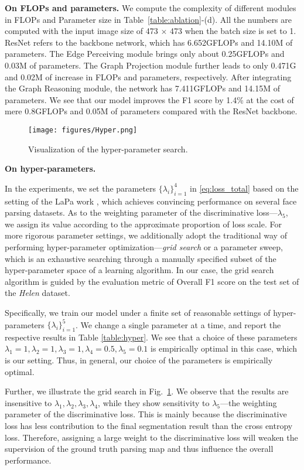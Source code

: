 \textbf{On FLOPs and parameters.} 
We compute the complexity of different modules in FLOPs and Parameter size in Table~\ref{table:ablation}-(d). 
All the numbers are computed with the input image size of 473 $\times$ 473 when the batch size is set to 1.
ResNet refers to the backbone network, which has 6.652GFLOPs and 14.10M of parameters. The Edge Perceiving module brings only about 0.25GFLOPs and 0.03M of parameters. 
The Graph Projection module further leads to only 0.471G and 0.02M of increase in FLOPs and parameters, respectively. After integrating the Graph Reasoning module, the network has 7.411GFLOPs and 14.15M of parameters. 
We see that our model improves the F1 score by 1.4\% at the cost of mere 0.8GFLOPs and 0.05M of parameters compared with the ResNet backbone.  

\begin{figure}[htbp]
    \centering
    \texttt{[image: figures/Hyper.png]}
    \caption{Visualization of the hyper-parameter search.}
    \label{fig:hyper}
\end{figure}


\textbf{On hyper-parameters.}

In the experiments, we set the parameters $\{\lambda_i\}_{i=1}^4$ in \eqref{eq:loss_total} based on the setting of the LaPa work \cite{liu2020new}, which achieves convincing performance on several face parsing datasets. As to the weighting parameter of the discriminative loss---$\lambda_5$, we assign its value according to the approximate proportion of loss scale.
For more rigorous parameter settings, we additionally adopt the traditional way of performing hyper-parameter optimization---{\it grid search} or a parameter sweep, which is an exhaustive searching through a manually specified subset of the hyper-parameter space of a learning algorithm. 
In our case, the grid search algorithm is guided by the evaluation metric of Overall F1 score on the test set of the {\it Helen} dataset. 

Specifically, we train our model under a finite set of reasonable settings of hyper-parameters $\{\lambda_i\}_{i=1}^5$. We change a single parameter at a time, and report the respective results in Table \ref{table:hyper}. 
We see that a choice of these parameters $\lambda_1 =1,\lambda_2 =1,\lambda_3 =1,\lambda_4 =0.5,\lambda_5=0.1$ is empirically optimal in this case, which is our setting. Thus, in general, our choice of the parameters is empirically optimal.

Further, we illustrate the grid search in Fig.~\ref{fig:hyper}. 
We observe that the results are insensitive to $\lambda_1, \lambda_2,\lambda_3,\lambda_4$, while they show sensitivity to $\lambda_5$---the weighting parameter of the discriminative loss. This is mainly because the discriminative loss has less contribution to the final segmentation result than the cross entropy loss. 
Therefore, assigning a large weight to the discriminative loss will weaken the supervision of the ground truth parsing map and thus influence the overall performance.


